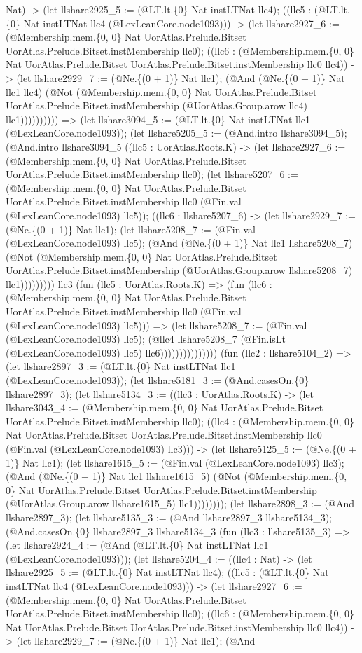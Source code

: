 \documentclass[11pt]{article}
\begin{document}
Nat) -> (let llshare2925\_5 := (@LT.lt.\{0\} Nat instLTNat llc4); ((llc5 : (@LT.lt.\{0\} Nat instLTNat llc4 (@LexLeanCore.node1093))) -> (let llshare2927\_6 := (@Membership.mem.\{0, 0\} Nat UorAtlas.Prelude.Bitset UorAtlas.Prelude.Bitset.instMembership llc0); ((llc6 : (@Membership.mem.\{0, 0\} Nat UorAtlas.Prelude.Bitset UorAtlas.Prelude.Bitset.instMembership llc0 llc4)) -> (let llshare2929\_7 := (@Ne.\{(0 + 1)\} Nat llc1); (@And (@Ne.\{(0 + 1)\} Nat llc1 llc4) (@Not (@Membership.mem.\{0, 0\} Nat UorAtlas.Prelude.Bitset UorAtlas.Prelude.Bitset.instMembership (@UorAtlas.Group.arow llc4) llc1)))))))))) => (let llshare3094\_5 := (@LT.lt.\{0\} Nat instLTNat llc1 (@LexLeanCore.node1093)); (let llshare5205\_5 := (@And.intro llshare3094\_5); (@And.intro llshare3094\_5 ((llc5 : UorAtlas.Roots.K) -> (let llshare2927\_6 := (@Membership.mem.\{0, 0\} Nat UorAtlas.Prelude.Bitset UorAtlas.Prelude.Bitset.instMembership llc0); (let llshare5207\_6 := (@Membership.mem.\{0, 0\} Nat UorAtlas.Prelude.Bitset UorAtlas.Prelude.Bitset.instMembership llc0 (@Fin.val (@LexLeanCore.node1093) llc5)); ((llc6 : llshare5207\_6) -> (let llshare2929\_7 := (@Ne.\{(0 + 1)\} Nat llc1); (let llshare5208\_7 := (@Fin.val (@LexLeanCore.node1093) llc5); (@And (@Ne.\{(0 + 1)\} Nat llc1 llshare5208\_7) (@Not (@Membership.mem.\{0, 0\} Nat UorAtlas.Prelude.Bitset UorAtlas.Prelude.Bitset.instMembership (@UorAtlas.Group.arow llshare5208\_7) llc1))))))))) llc3 (fun (llc5 : UorAtlas.Roots.K) => (fun (llc6 : (@Membership.mem.\{0, 0\} Nat UorAtlas.Prelude.Bitset UorAtlas.Prelude.Bitset.instMembership llc0 (@Fin.val (@LexLeanCore.node1093) llc5))) => (let llshare5208\_7 := (@Fin.val (@LexLeanCore.node1093) llc5); (@llc4 llshare5208\_7 (@Fin.isLt (@LexLeanCore.node1093) llc5) llc6))))))))))))))) (fun (llc2 : llshare5104\_2) => (let llshare2897\_3 := (@LT.lt.\{0\} Nat instLTNat llc1 (@LexLeanCore.node1093)); (let llshare5181\_3 := (@And.casesOn.\{0\} llshare2897\_3); (let llshare5134\_3 := ((llc3 : UorAtlas.Roots.K) -> (let llshare3043\_4 := (@Membership.mem.\{0, 0\} Nat UorAtlas.Prelude.Bitset UorAtlas.Prelude.Bitset.instMembership llc0); ((llc4 : (@Membership.mem.\{0, 0\} Nat UorAtlas.Prelude.Bitset UorAtlas.Prelude.Bitset.instMembership llc0 (@Fin.val (@LexLeanCore.node1093) llc3))) -> (let llshare5125\_5 := (@Ne.\{(0 + 1)\} Nat llc1); (let llshare1615\_5 := (@Fin.val (@LexLeanCore.node1093) llc3); (@And (@Ne.\{(0 + 1)\} Nat llc1 llshare1615\_5) (@Not (@Membership.mem.\{0, 0\} Nat UorAtlas.Prelude.Bitset UorAtlas.Prelude.Bitset.instMembership (@UorAtlas.Group.arow llshare1615\_5) llc1)))))))); (let llshare2898\_3 := (@And llshare2897\_3); (let llshare5135\_3 := (@And llshare2897\_3 llshare5134\_3); (@And.casesOn.\{0\} llshare2897\_3 llshare5134\_3 (fun (llc3 : llshare5135\_3) => (let llshare2924\_4 := (@And (@LT.lt.\{0\} Nat instLTNat llc1 (@LexLeanCore.node1093))); (let llshare5204\_4 := ((llc4 : Nat) -> (let llshare2925\_5 := (@LT.lt.\{0\} Nat instLTNat llc4); ((llc5 : (@LT.lt.\{0\} Nat instLTNat llc4 (@LexLeanCore.node1093))) -> (let llshare2927\_6 := (@Membership.mem.\{0, 0\} Nat UorAtlas.Prelude.Bitset UorAtlas.Prelude.Bitset.instMembership llc0); ((llc6 : (@Membership.mem.\{0, 0\} Nat UorAtlas.Prelude.Bitset UorAtlas.Prelude.Bitset.instMembership llc0 llc4)) -> (let llshare2929\_7 := (@Ne.\{(0 + 1)\} Nat llc1); (@And 
\end{document}
